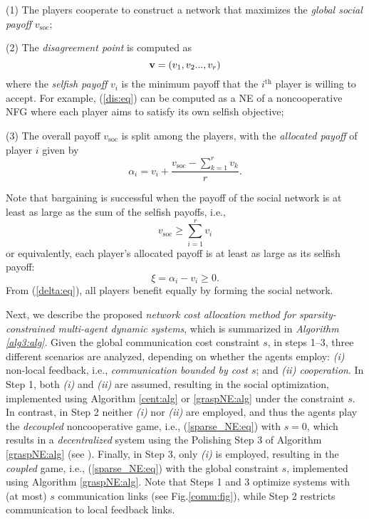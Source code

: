\documentclass[12pt, draftclsnofoot,onecolumn]{IEEEtran}
\begin{document}
(1) The players cooperate to construct a network that maximizes the {\it global social payoff} $v_{\mathrm{soc}}$; 

(2) The {\it disagreement point} is computed as
\begin{equation}
	\label{dis:eq}
{\bold v} = (v_1,v_2 ..., v_r)
\end{equation}
\noindent where the {\it selfish payoff} $v_i$ is the minimum payoff that the $i^{\mathrm{th}}$ player is willing to accept. For example, (\ref{dis:eq}) can be computed as a NE of a noncooperative NFG where each player aims to satisfy its own selfish objective; 

(3) The overall payoff $v_{\mathrm{soc}}$ is split among the players, with the {\it allocated payoff} of player $i$ given by \cite{kawamori2016nash}
	\begin{equation}
		\label{nbs:eq}
		\alpha_i=v_i + \frac{v_{\mathrm{soc}} - \sum_{k=1}^r{v_k}}{r}.
		\end{equation}

\noindent Note that bargaining is successful when the payoff of the social network is at least as large as the sum of the selfish payoffs, i.e.,
\begin{equation}
	\label{eqB:eq}
	v_{\mathrm{soc}} \geq \sum_{i=1}^{r}{v_i}
	\end{equation}
\noindent or equivalently, each player's allocated payoff is at least as large as its selfish payoff:
\begin{equation}
	\label{delta:eq}
    \xi =\alpha_i -  v_i \geq 0.
\end{equation}
\noindent From (\ref{delta:eq}), all players benefit equally by forming the social network.

Next, we describe the proposed {\it network cost allocation method for sparsity-constrained multi-agent dynamic systems}, which is summarized in {\it Algorithm \ref{alg3:alg}}. Given the global communication cost constraint $s$, in steps 1--3, three different scenarios are analyzed, depending on whether the agents employ: {\it (i)} non-local feedback, i.e., {\it communication bounded by cost $s$}; and {\it (ii) cooperation}. In Step 1, both {\it(i)} and {\it(ii)} are assumed, resulting in the social optimization, implemented using Algorithm \ref{cent:alg} or \ref{graspNE:alg} under the constraint $s$. In contrast, in Step 2 neither {\it (i)} nor {\it (ii)} are employed, and thus the agents play the {\it decoupled} noncooperative game, i.e., (\ref{sparse_NE:eq}) with $s=0$, which results in a {\it decentralized} system using the Polishing Step 3 of Algorithm \ref{graspNE:alg} (see \cite{lianensuring}). Finally, in Step 3, only {\it (i)} is employed, resulting in the {\it coupled} game, i.e., (\ref{sparse_NE:eq}) with the global constraint $s$, implemented using Algorithm \ref{graspNE:alg}. Note that Steps 1 and 3 optimize systems with (at most) $s$ communication links (see Fig.\ref{comm:fig}), while Step 2 restricts communication to local feedback links.  
\end{document}
